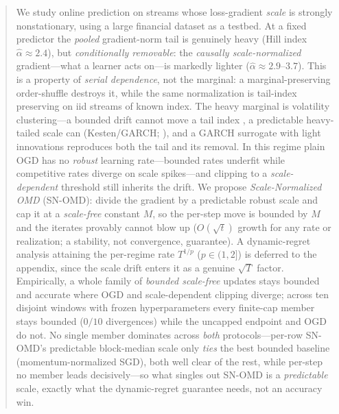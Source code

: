 \documentclass{article}
\begin{document}

\printAffiliationsAndNotice{}

\begin{abstract}
We study online prediction on streams whose loss-gradient \emph{scale} is strongly
nonstationary, using a large financial dataset as a testbed. At a fixed predictor the
\emph{pooled} gradient-norm tail is genuinely heavy (Hill index $\hat\alpha\approx2.4$), but
\emph{conditionally removable}: the \emph{causally scale-normalized} gradient---what a learner
acts on---is markedly lighter ($\hat\alpha\approx2.9$--$3.7$). This is a property of
\emph{serial dependence}, not the marginal: a marginal-preserving order-shuffle destroys it,
while the same normalization is tail-index preserving on iid streams of known index. The heavy
marginal is volatility clustering---a bounded drift cannot move a tail index
\citep{breiman1965}, a predictable heavy-tailed scale can (Kesten/GARCH; \citealt{kesten1973}),
and a GARCH surrogate with light innovations reproduces both the tail and its removal. In this
regime plain OGD has no \emph{robust} learning rate---bounded rates underfit while competitive
rates diverge on scale spikes---and clipping to a \emph{scale-dependent} threshold still
inherits the drift. We propose \emph{Scale-Normalized OMD} (SN-OMD): divide the gradient by a
predictable robust scale and cap it at a \emph{scale-free} constant $M$, so the per-step move
is bounded by $M$ and the iterates provably cannot blow up ($O(\sqrt t)$ growth for any rate
or realization; a stability, not convergence, guarantee). A dynamic-regret analysis attaining
the per-regime rate $T^{1/p}$ ($p\in(1,2]$) is deferred to the appendix, since the scale drift
enters it as a genuine $\sqrt T$ factor. Empirically, a whole family of \emph{bounded
scale-free} updates stays bounded and accurate where OGD and scale-dependent clipping diverge;
across ten disjoint windows with frozen hyperparameters every finite-cap member stays bounded
($0/10$ divergences) while the uncapped endpoint and OGD do not. No single member dominates
across \emph{both} protocols---per-row SN-OMD's predictable block-median scale only \emph{ties}
the best bounded baseline (momentum-normalized SGD), both well clear of the rest, while
per-step no member leads decisively---so what singles out SN-OMD is a \emph{predictable} scale,
exactly what the dynamic-regret guarantee needs, not an accuracy win.
\end{abstract}
\end{document}
